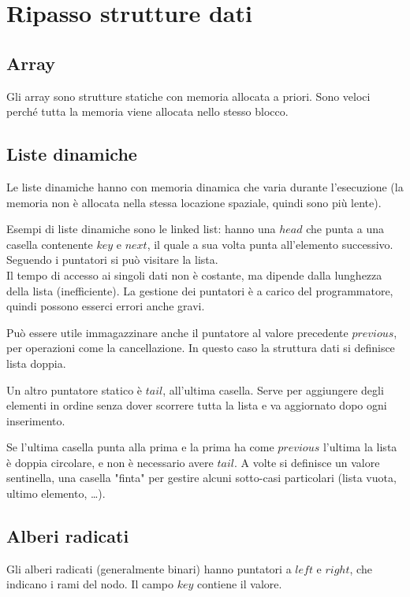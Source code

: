 \newpage
\section{Ripasso strutture dati}

\subsection{Array}
Gli array sono strutture statiche con memoria allocata a priori. Sono veloci perché tutta la memoria viene allocata nello stesso blocco.

\subsection{Liste dinamiche}
Le liste dinamiche hanno con memoria dinamica che varia durante l'esecuzione (la memoria non è allocata nella stessa locazione spaziale, quindi sono più lente). \par
Esempi di liste dinamiche sono le linked list: hanno una $head$ che punta a una casella contenente $key$ e $next$, il quale a sua volta punta all'elemento successivo. Seguendo i puntatori si può visitare la lista. \\
Il tempo di accesso ai singoli dati non è costante, ma dipende dalla lunghezza della lista (inefficiente). La gestione dei puntatori è a carico del programmatore, quindi possono esserci errori anche gravi. \par 
Può essere utile immagazzinare anche il puntatore al valore precedente $previous$, per operazioni come la cancellazione. In questo caso la struttura dati si definisce lista doppia. \par
Un altro puntatore statico è $tail$, all'ultima casella. Serve per aggiungere degli elementi in ordine senza dover scorrere tutta la lista e va aggiornato dopo ogni inserimento. \par 
Se l'ultima casella punta alla prima e la prima ha come $previous$ l'ultima la lista è doppia circolare, e non è necessario avere $tail$.
A volte si definisce un valore sentinella, una casella "finta" per gestire alcuni sotto-casi particolari (lista vuota, ultimo elemento, \dots).

\subsection{Alberi radicati}
Gli alberi radicati (generalmente binari) hanno puntatori a $left$ e $right$, che indicano i rami del nodo. Il campo $key$ contiene il valore.

